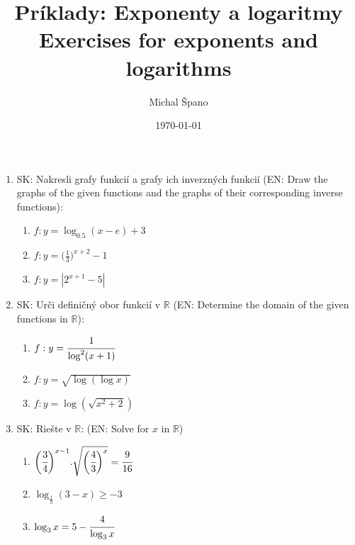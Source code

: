 \documentclass{homework}
\author{Michal Špano}
\date{\today}
\title{Príklady: Exponenty a logaritmy \\ Exercises for exponents and logarithms}
\begin{document}
\maketitle

\begin{enumerate}
    
    \item SK: Nakresli grafy funkcií a grafy ich inverzných funkcií (EN: Draw the graphs of the given functions and the graphs of their corresponding inverse functions): \\
    \begin{enumerate}
        \item $f:y=\log_{0.5} (x-e) + 3$ \\
        \item $f:y=\big(\frac{1}{3}\big)^{x+2}-1$ \\
        \item $f:y=\left|2^{x+1}-5\right|$ \\ 
    \end{enumerate}
    
    \item SK: Urči definičný obor funkcií v $\mathbb{R}$ (EN: Determine the domain of the given functions in $\mathbb{R}$): \\
    \begin{enumerate}
        \item $f:y=\cfrac{1}{\log^{2} (x+1)}$ \\
        \item $f:y=\sqrt{\log (\log x)}$ \\
        \item $f:y=\log (\sqrt{x^{2}+2})$ \\
    \end{enumerate}
    
    \item SK: Riešte v $\mathbb{R}$: (EN: Solve for $x$ in $\mathbb{R}$) \\
    \begin{enumerate}
        \item $\bigg(\cfrac{3}{4}\bigg)^{x-1}.
        \sqrt{\bigg(\cfrac{4}{3}\bigg)^{x}}
        =\cfrac{9}{16}$ \\
        \item $\log_{\frac{1}{3}} (3-x) \geq -3$ \\
        \item $\log_3 x = 5 - \cfrac{4}{\log_3 x}$ \\
    \end{enumerate}
    

\end{enumerate}
\end{document}
